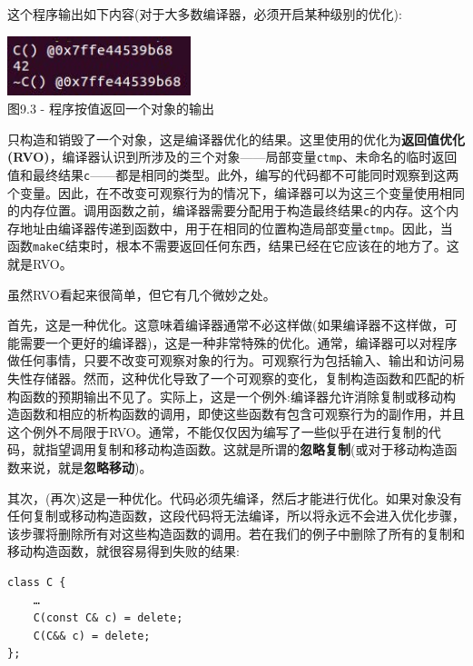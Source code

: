 这个程序输出如下内容(对于大多数编译器，必须开启某种级别的优化):

\begin{center}
\includegraphics[width=0.4\textwidth]{content/3/chapter9/images/3.jpg}\\
图9.3 - 程序按值返回一个对象的输出
\end{center}

只构造和销毁了一个对象，这是编译器优化的结果。这里使用的优化为\textbf{返回值优化(RVO)}，编译器认识到所涉及的三个对象——局部变量\texttt{ctmp}、未命名的临时返回值和最终结果\texttt{c}——都是相同的类型。此外，编写的代码都不可能同时观察到这两个变量。因此，在不改变可观察行为的情况下，编译器可以为这三个变量使用相同的内存位置。调用函数之前，编译器需要分配用于构造最终结果\texttt{c}的内存。这个内存地址由编译器传递到函数中，用于在相同的位置构造局部变量\texttt{ctmp}。因此，当函数\texttt{makeC}结束时，根本不需要返回任何东西，结果已经在它应该在的地方了。这就是RVO。

虽然RVO看起来很简单，但它有几个微妙之处。 

首先，这是一种优化。这意味着编译器通常不必这样做(如果编译器不这样做，可能需要一个更好的编译器)，这是一种非常特殊的优化。通常，编译器可以对程序做任何事情，只要不改变可观察对象的行为。可观察行为包括输入、输出和访问易失性存储器。然而，这种优化导致了一个可观察的变化，复制构造函数和匹配的析构函数的预期输出不见了。实际上，这是一个例外:编译器允许消除复制或移动构造函数和相应的析构函数的调用，即使这些函数有包含可观察行为的副作用，并且这个例外不局限于RVO。通常，不能仅仅因为编写了一些似乎在进行复制的代码，就指望调用复制和移动构造函数。这就是所谓的\textbf{忽略复制}(或对于移动构造函数来说，就是\textbf{忽略移动})。

其次，(再次)这是一种优化。代码必须先编译，然后才能进行优化。如果对象没有任何复制或移动构造函数，这段代码将无法编译，所以将永远不会进入优化步骤，该步骤将删除所有对这些构造函数的调用。若在我们的例子中删除了所有的复制和移动构造函数，就很容易得到失败的结果:

\begin{lstlisting}[style=styleCXX]
class C {
	…
	C(const C& c) = delete;
	C(C&& c) = delete;
}; 
\end{lstlisting}

